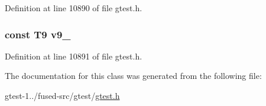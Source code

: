 \-Definition at line 10890 of file gtest.\-h.

\hypertarget{classtesting_1_1internal_1_1ValueArray11_a6356e16cf54a9dfac8525f20242af31e}{
\subsubsection[{v9\-\_\-}]{\setlength{\rightskip}{0pt plus 5cm}const \-T9 {\bf v9\-\_\-}}}\label{df/d49/classtesting_1_1internal_1_1ValueArray11_a6356e16cf54a9dfac8525f20242af31e}


\-Definition at line 10891 of file gtest.\-h.



\-The documentation for this class was generated from the following file\-:\begin{DoxyCompactItemize}
\item 
gtest-\/1../fused-\/src/gtest/\hyperlink{fused-src_2gtest_2gtest_8h}{gtest.\-h}\end{DoxyCompactItemize}
